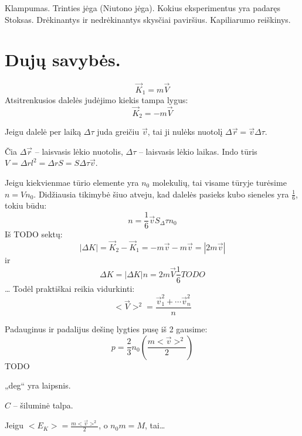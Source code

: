 Klampumas. Trinties jėga (Niutono jėga). Kokius eksperimentus yra padaręs
Stoksas. Drėkinantys ir nedrėkinantys skysčiai paviršius. Kapiliarumo
reiškinys.

\section{Dujų savybės.}

\begin{equation*}
  \vec{K}_{1} = m \vec{V}
\end{equation*}
Atsitrenkusios dalelės judėjimo kiekis tampa lygus:
\begin{equation*}
  \vec{K}_{2} = -m \vec{V}
\end{equation*}

Jeigu dalelė per laiką $\Delta \tau$ juda greičiu $\vec{v}$, tai ji
nulėks nuotolį $\Delta \vec{r} = \vec{v} \Delta \tau$.

Čia $\Delta \vec{r}$ – laisvasis lėkio nuotolis, $\Delta \tau$ – laisvasis
lėkio laikas.
Indo tūris $V= \Delta r l^{2} = \Delta r S = S \Delta \tau \vec{v}$.

Jeigu kiekvienmae tūrio elemente yra $n_{0}$ molekulių, tai visame tūryje
turėsime $n = Vn_{0}$. Didžiausia tikimybė šiuo atveju, kad dalelės pasieks
kubo sieneles yra $\frac{1}{6}$, tokiu būdu:
\begin{equation}
  n = \frac{1}{6} \vec{v}S_{\Delta}\tau n_{0}
  \label{eq:dujos}
\end{equation}
Iš TODO sektų:
\begin{equation*}
  |\Delta K | = \vec{K}_{2} - \vec{K}_{1} = - m \vec{v} - m \vec{v} =
  |2m\vec{v}|
\end{equation*}
ir 
\begin{equation*}
  \Delta K = |\Delta K| n = 2m \vec{V} \frac{1}{6} TODO
\end{equation*}
…
Todėl praktiškai reikia vidurkinti:
\begin{equation*}
  <\vec{V}>^{2} = \frac{\vec{v}_{1}^{2} + \cdots \vec{v}^{2}_{n}}{n}
\end{equation*}

Padauginus ir padalijus dešinę lygties pusę iš 2 gausime:
\begin{equation*}
  p = \frac{2}{3} n_{0} \left( \frac{m <\vec{v}>^{2}}{2} \right)
\end{equation*}
TODO

„deg“ yra laipsnis.

$C$ – šiluminė talpa.

Jeigu $<E_{K}> = \frac{m <\vec{v}>^{2}}{2}$, o $n_{0}m = M$, tai…


